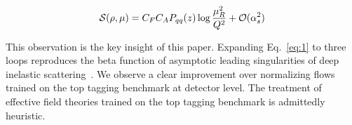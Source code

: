 \begin{equation}
  \mathcal{S}(\rho, \mu) = C_F C_A P_{qq}(z) \log\frac{\mu_R^2}{Q^2} + \mathcal{O}(\alpha_s^{2})
  \label{eq:3}
\end{equation}

This observation is the key insight of this paper. Expanding
Eq.~\eqref{eq:1} to three loops reproduces the beta function of
asymptotic leading singularities of deep inelastic
scattering~\cite{TPC:1827-Parton-Shower-Tuning-with-Universal-Transformers-at-RHIC-September-25-2026}.
We observe a clear improvement over normalizing flows trained on the top
tagging benchmark at detector level. The treatment of effective field
theories trained on the top tagging benchmark is admittedly heuristic.

